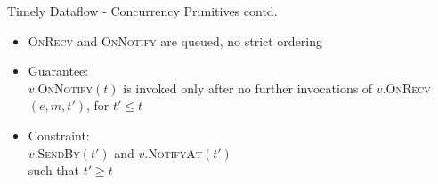 \begin{frame}[t]{Timely Dataflow - Concurrency Primitives contd.}

  \vspace{0.5cm}
  \begin{center}
  \end{center}

  \begin{itemize}
    \item \textsc{OnRecv} and \textsc{OnNotify} are queued, no strict ordering
    \vspace{0.15cm}
    \item Guarantee: \\ $v$.\textsc{OnNotify}$(t)$ is invoked only after no further invocations of
          $v$.\textsc{OnRecv}$(e,m,t')$, for $t' \leq t$
    \vspace{0.15cm}
    \item Constraint: \\ $v$.\textsc{SendBy}$(t')$ and $v$.\textsc{NotifyAt}$(t')$ \\
          such that $t' \geq t$
  \end{itemize}

\end{frame}

